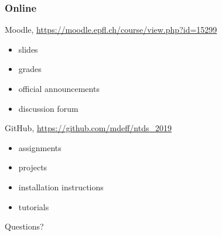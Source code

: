 \documentclass[aspectratio=169]{beamer}
\begin{document}
\begin{frame}
	\frametitle{Online}
	\begin{block}{Moodle, \url{https://moodle.epfl.ch/course/view.php?id=15299}}
	\begin{minipage}{0.25\linewidth}
	\begin{itemize}
		\item slides
		\item grades
	\end{itemize}
	\end{minipage}
	\begin{minipage}{0.45\linewidth}
	\begin{itemize}
		\item official announcements
		\item discussion forum
	\end{itemize}
	\end{minipage}
	\end{block}
	\vspace{1em}
	\begin{block}{GitHub, \url{https://github.com/mdeff/ntds_2019}}
	\begin{minipage}{0.25\linewidth}
	\begin{itemize}
		\item assignments
		\item projects
	\end{itemize}
	\end{minipage}
	\begin{minipage}{0.45\linewidth}
	\begin{itemize}
		\item installation instructions
		\item tutorials
	\end{itemize}
	\end{minipage}
	\end{block}
	\vfill
	\begin{center}
		\Huge Questions?
	\end{center}
\end{frame}

\end{document}
